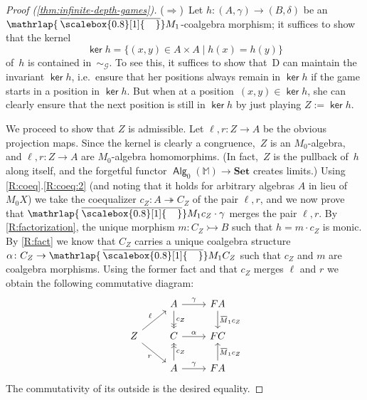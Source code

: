 \documentclass[sigconf,
			final%
			nonacm
                        ]{acmart}
\newcommand{\takeout}[1]{\empty}
\numberwithin{equation}{section}
\numberwithin{equation}{section}
\theoremstyle{plain}
\theoremstyle{definition}
\newcommand{\overbar}[1]{\mkern 1.5mu\overline{\mkern-2.5mu#1\mkern-1.5mu}\mkern 1.5mu}
\newcommand{\mybar}[3]{%
  \mathrlap{\hspace{#2}\overline{\scalebox{#1}[1]{\hphantom{\ensuremath{#3}}\vphantom{\rule{0pt}{5.5pt}}}}}\ensuremath{#3}
}
\DeclareMathOperator{\Ker}{\mathsf{ker}}
\newcommand{\infgameeq}{\sim_{\mathcal{G}}}
\newcommand{\barM}{\mybar{0.8}{2pt}{M}_1}
\newcommand{\epito}{\twoheadrightarrow}
\newcommand{\monoto}{\rightarrowtail}
\newcommand{\M}{\mathbb{M}}                   %
\newcommand{\Set}{\mathbf{Set}}
\DeclareMathOperator{\Alg}{\mathsf{Alg}}
\begin{document}
\begin{proof}[Proof (\cref{thm:infinite-depth-games})]
\medskip
\noindent
($\Rightarrow$)~Let $h\colon(A,\gamma)\to(B,\delta)$ be an
$\barM$-coalgebra morphism; it suffices to show that the kernel
\[
  \Ker h = \{(x,y)\in A\times A \mid h(x)=h(y)\}
\]
of~$h$ is contained in~$\infgameeq$. To see this, it suffices to show
that~D can maintain the invariant $\Ker h$, i.e.~ensure that her
positions always remain in $\Ker h$ if the game starts in a position
in $\Ker h$. But when at a position~$(x,y)\in\Ker h$, she can clearly
ensure that the next position is still in $\Ker h$ by just playing
$Z :=\Ker h$.

We proceed to show that $Z$ is admissible. Let
$\ell, r\colon Z \to A$ be the obvious projection maps. Since the
kernel is clearly a congruence,~$Z$ is an $M_0$-algebra, and
$\ell, r\colon Z \to A$ are $M_0$-algebra homomorphims. (In fact,~$Z$
is the pullback of~$h$ along itself, and the forgetful functor
$\Alg_0(\M) \to \Set$ creates limits.)  Using
\cref{R:coeq}.\ref{R:coeq:2} (and noting that it holds for
arbitrary algebras $A$ in lieu of $M_0X$) we take the coequalizer
$c_Z\colon A \epito C_Z$ of the pair $\ell,r$, and we now prove that
$\barM c_Z \cdot \gamma $ merges the pair $\ell, r$. %
By \cref{R:factorization}, the unique morphism
$m\colon C_Z \monoto B$ such that $h = m \cdot c_Z$ is monic. By
\cref{R:fact} we know that $C_Z$ carries a unique coalgebra
structure $\alpha\colon C_Z \to \barM C_Z$ such that $c_Z$ and $m$ are
coalgebra morphisms. Using the former fact and that $c_Z$ merges
$\ell$ and $r$ we obtain the following commutative diagram:
\[
  \begin{tikzcd}
    &
    A
    \ar{r}{\gamma}
    \ar[->>]{d}{c_Z}
    &
    FA
    \ar{d}{\overbar M_1 c_Z}
    \\
    Z
    \ar{ru}{\ell}
    \ar{rd}[swap]{r}
    &
    C
    \ar{r}{\alpha}
    &
    FC
    \\
    &
    A\ar{r}{\gamma}
    \ar[->>]{u}[swap]{c_Z}
    &
    FA
    \ar{u}[swap]{\overbar M_1 c_Z}
  \end{tikzcd}
\]
The commutativity of its outside is the desired equality.%
\takeout{
  Further we consider the kernel is clearly a congruence,~$Z$ is an
  $M_0$-algebra, and $\ell, r\colon Z \to A$ are $M_0$-algebra
  homomorphims. (In fact,~$Z$ is the pullback of~$h$ along itself, and
  the the forgetful functor $\Alg(M_0) \to \Set$ creates limits.)
  Using \cref{R:coeq}.\ref{R:coeq:2} we take the coequalizer of
  $c_Z\colon A \epito C_Z$ and show that $\barM c_Z \cdot \gamma$
}
\end{proof}
\end{document}
